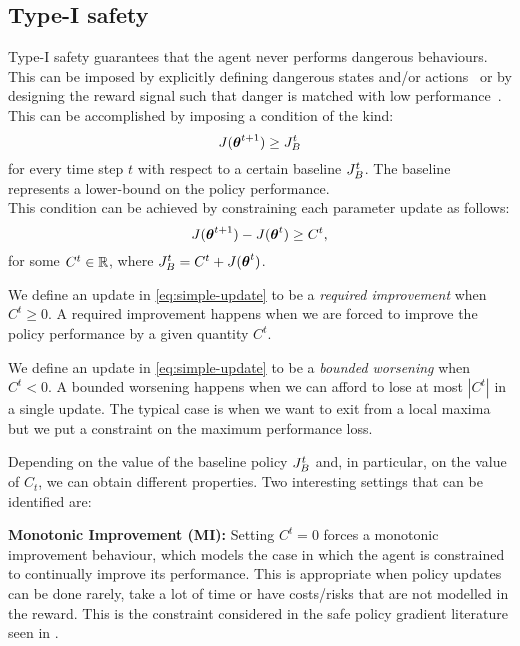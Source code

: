 \subsection{Type-I safety} 
Type-I safety guarantees that the agent never performs dangerous behaviours. This can be imposed by explicitly defining dangerous states and/or actions~\cite{gehring2013smart} or by designing the reward signal such that danger is matched with low performance~\cite{safe_iteration}\cite{trpo}\cite{Petrik:2016:SPI:3157096.3157354}.\\
This can be accomplished by imposing a condition of the kind:%
%
\begin{equation}
J(\vtheta^{t+1}) \geq \jbase
\end{equation}
for every time step $t$ with respect to a certain baseline $\jbase$. The baseline represents a lower-bound on the policy performance.\\
This condition can be achieved by constraining each parameter update as follows:
\begin{equation}\label{eq:simple-update}
J(\vtheta^{t+1}) - J(\vtheta^{t}) \geq C^t,
\end{equation}
for some $C^t\in \realspace$, where $\jbase[t]=C^t + J(\vtheta^t)$.
\begin{definition}\label{def:required-improvement}
We define an update in \ref{eq:simple-update} to be a \textit{required improvement} when $C^t \geq 0$. A required improvement happens when we are forced to improve the policy performance by a given quantity $C^t$.
\end{definition}
\begin{definition}\label{def:bounded-worsening}
We define an update in \ref{eq:simple-update} to be a \textit{bounded worsening} when $C^t < 0$. A bounded worsening happens when we can afford to lose at most $|C^t|$ in a single update. The typical case is when we want to exit from a local maxima but we put a constraint on the maximum performance loss.
\end{definition}



Depending on the value of the baseline policy $\jbase[t]$ and, in particular, on the value of $C_t$, we can obtain different properties. Two interesting settings that can be identified are:

\textbf{Monotonic Improvement (MI):} Setting $C^t= 0$ forces a monotonic improvement behaviour, which models the case in which the agent is constrained to continually improve its performance. This is appropriate when policy updates can be done rarely, take a lot of time or have costs/risks that are not modelled in the reward. This is the constraint considered in the safe policy gradient literature seen in .

